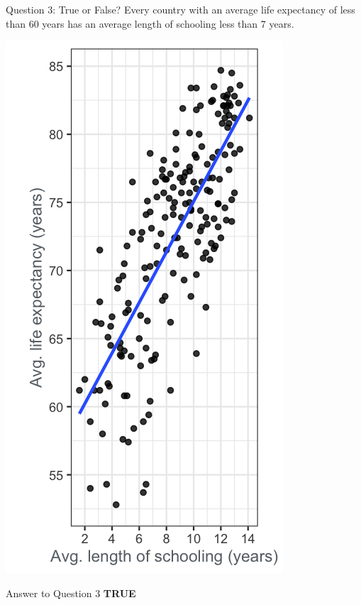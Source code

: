 \documentclass[
  ignorenonframetext,
]{beamer}
\begin{document}
\begin{frame}{Question 3: True or False?}
\label{question-3-true-or-false}
Every country with an average life expectancy of less than 60 years has
an average length of schooling less than 7 years.

\includegraphics{../images/im40.png}
\end{frame}

\begin{frame}{Answer to Question 3}
\label{answer-to-question-3}
\textbf{TRUE}
\end{frame}
\end{document}
